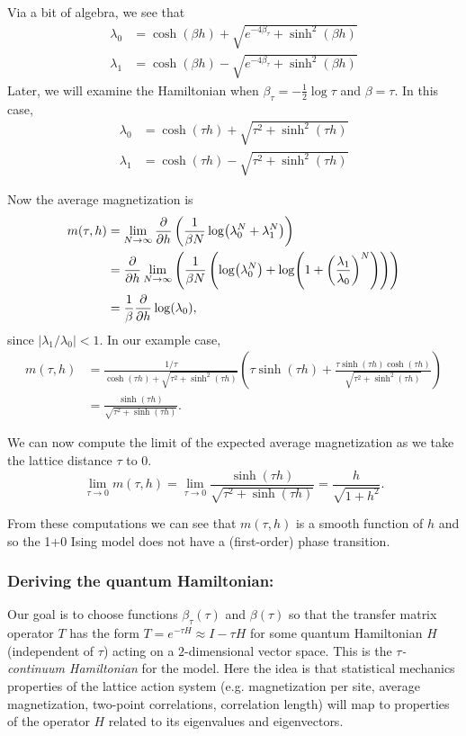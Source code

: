 \documentclass[11pt,reqno]{amsart}
\begin{document}
	Via a bit of algebra, we see that 
	\begin{align*}
		\lambda_0 &=\cosh(\beta h)+ \sqrt{e^{-4\beta_\tau} +\sinh^2(\beta h) } \\
		\lambda_1 &=\cosh(\beta h)- \sqrt{e^{-4\beta_\tau} +\sinh^2(\beta h) }
	\end{align*} 
	Later, we will examine the Hamiltonian when $\beta_\tau=-\frac{1}{2}\log \tau$ and $\beta = \tau$.
	In this case,
	\begin{align*}
		\lambda_0 &=\cosh(\tau h)+ \sqrt{\tau^2 +\sinh^2(\tau h)} \\
		\lambda_1 &=\cosh(\tau h)- \sqrt{\tau^2 +\sinh^2(\tau h)}
	\end{align*}
	
	Now the average magnetization is
	\begin{align*}
		m(\tau, h)&=\lim_{N\to \infty}\frac{\partial}{\partial h}\left( \frac{1}{\beta N}\log(\lambda_0^N+\lambda_1^N) \right) \\
			&=\frac{\partial}{\partial h}\lim_{N\to \infty}\left( \frac{1}{\beta N}\left(\log(\lambda_0^N)+\log(1+\left(\frac{\lambda_1}{\lambda_0}\right)^N)\right) \right) \\
			&= \frac{1}{\beta}\frac{\partial}{\partial h} \log(\lambda_0),
	\end{align*}
	since $|\lambda_1/\lambda_0| <1.$
	In our example case,
	\begin{align*}
		m(\tau,h)&= \frac{1/\tau}{\cosh(\tau h)+ \sqrt{\tau^2 +\sinh^2(\tau h)}}\left( \tau \sinh(\tau h)+\frac{\tau \sinh(\tau h)\cosh(\tau h)}{\sqrt{\tau^2 +\sinh^2(\tau h)}} \right)\\
		&=\frac{\sinh(\tau h)}{\sqrt{\tau^2+\sinh(\tau h)}}.
	\end{align*}

	We can now compute the limit of the expected average magnetization as we take the lattice distance $\tau$ to 0.
		\[ \lim_{\tau \to 0} m(\tau,h) = \lim_{\tau \to 0} \frac{\sinh(\tau h)}{\sqrt{\tau^2+\sinh(\tau h)}} = \frac{h}{\sqrt{1+h^2}}. \]
		
	From these computations we can see that $m(\tau,h)$ is a smooth function of $h$ and so the 1+0 Ising model does not have a (first-order) phase transition.
	
	\subsubsection{Deriving the quantum Hamiltonian:}
	
	Our goal is to choose functions $\beta_\tau(\tau)$ and $\beta(\tau)$ so that the transfer matrix operator $T$ has the form $T=e^{-\tau H} \approx I-\tau H$ for some quantum Hamiltonian $H$ (independent of $\tau$) acting on a $2$-dimensional vector space. 
	This is the \emph{$\tau$-continuum Hamiltonian} for the model. 
	Here the idea is that statistical mechanics properties of the lattice action system (e.g. magnetization per site, average magnetization, two-point correlations, correlation length) will map to properties of the operator $H$ related to its eigenvalues and eigenvectors.
	
\end{document}
